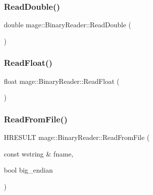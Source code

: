 \hypertarget{classmage_1_1_binary_reader_aa9d54a457a85d6f488d818c0a3e56560}{}\label{classmage_1_1_binary_reader_aa9d54a457a85d6f488d818c0a3e56560} 
\subsubsection{\texorpdfstring{Read\+Double()}{ReadDouble()}}
{\footnotesize\ttfamily double mage\+::\+Binary\+Reader\+::\+Read\+Double (\begin{DoxyParamCaption}{ }\end{DoxyParamCaption})\hspace{0.3cm}{\ttfamily [protected]}}

\hypertarget{classmage_1_1_binary_reader_af18ab2185b7c766c2183ab54f4676d57}{}\label{classmage_1_1_binary_reader_af18ab2185b7c766c2183ab54f4676d57} 
\subsubsection{\texorpdfstring{Read\+Float()}{ReadFloat()}}
{\footnotesize\ttfamily float mage\+::\+Binary\+Reader\+::\+Read\+Float (\begin{DoxyParamCaption}{ }\end{DoxyParamCaption})\hspace{0.3cm}{\ttfamily [protected]}}

\hypertarget{classmage_1_1_binary_reader_ad1d395eabc03da0a52fc0df59623e0a4}{}\label{classmage_1_1_binary_reader_ad1d395eabc03da0a52fc0df59623e0a4} 
\subsubsection{\texorpdfstring{Read\+From\+File()}{ReadFromFile()}}
{\footnotesize\ttfamily H\+R\+E\+S\+U\+LT mage\+::\+Binary\+Reader\+::\+Read\+From\+File (\begin{DoxyParamCaption}\item[{const wstring \&}]{fname,  }\item[{bool}]{big\+\_\+endian }\end{DoxyParamCaption})}

